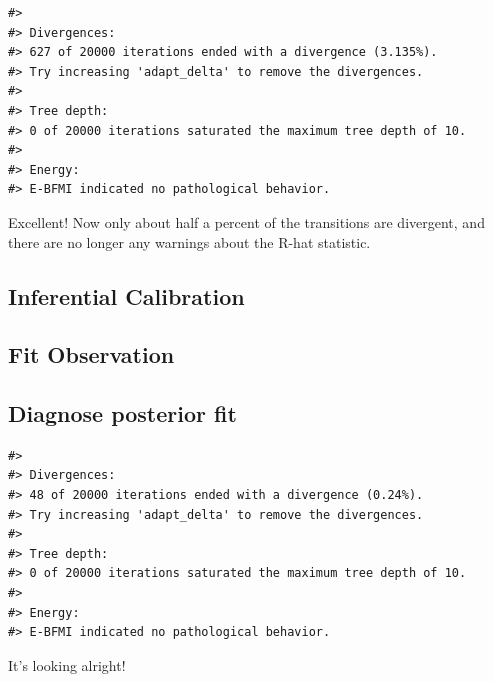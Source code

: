 \documentclass[11pt, oneside, openany]{scrbook}
\begin{document}
\begin{verbatim}
#> 
#> Divergences:
#> 627 of 20000 iterations ended with a divergence (3.135%).
#> Try increasing 'adapt_delta' to remove the divergences.
#> 
#> Tree depth:
#> 0 of 20000 iterations saturated the maximum tree depth of 10.
#> 
#> Energy:
#> E-BFMI indicated no pathological behavior.
\end{verbatim}

Excellent! Now only about half a percent of the transitions are divergent, and there are no longer any warnings about the R-hat statistic.

\hypertarget{iter2-inferential-calibration}{%
\subsection{Inferential Calibration}\label{iter2-inferential-calibration}}

\hypertarget{iter2-fit-obs}{%
\subsection{Fit Observation}\label{iter2-fit-obs}}

\hypertarget{iter2-diagnose-post}{%
\subsection{Diagnose posterior fit}\label{iter2-diagnose-post}}

\begin{verbatim}
#> 
#> Divergences:
#> 48 of 20000 iterations ended with a divergence (0.24%).
#> Try increasing 'adapt_delta' to remove the divergences.
#> 
#> Tree depth:
#> 0 of 20000 iterations saturated the maximum tree depth of 10.
#> 
#> Energy:
#> E-BFMI indicated no pathological behavior.
\end{verbatim}

It's looking alright!
\end{document}
